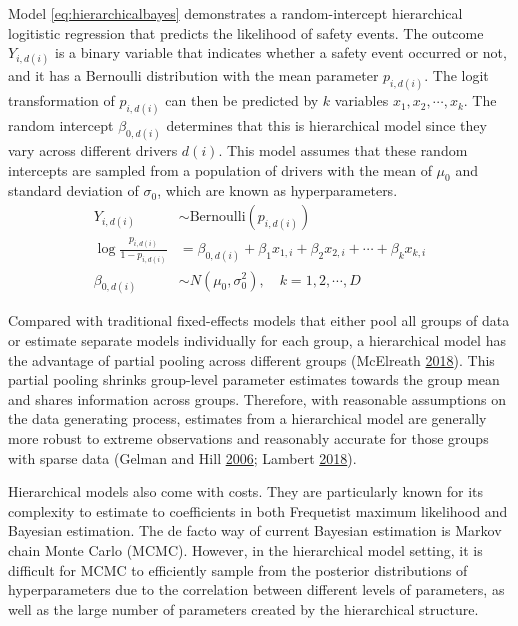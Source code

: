 \documentclass[12pt]{book}
\numberwithin{equation}{chapter}
\begin{document}
Model \eqref{eq:hierarchicalbayes} demonstrates a random-intercept hierarchical logitistic regression that predicts the likelihood of safety events. The outcome \(Y_{i, d(i)}\) is a binary variable that indicates whether a safety event occurred or not, and it has a Bernoulli distribution with the mean parameter \(p_{i, d(i)}\). The logit transformation of \(p_{i, d(i)}\) can then be predicted by \(k\) variables \(x_1, x_2, \cdots, x_k\). The random intercept \(\beta_{0, d(i)}\) determines that this is hierarchical model since they vary across different drivers \(d(i)\). This model assumes that these random intercepts are sampled from a population of drivers with the mean of \(\mu_0\) and standard deviation of \(\sigma_0\), which are known as hyperparameters.
\begin{equation}
\begin{split}
Y_{i, d(i)} &\sim \text{Bernoulli}(p_{i, d(i)})\\
\log\frac{p_{i, d(i)}}{1-p_{i, d(i)}} &= \beta_{0, d(i)} + \beta_1x_{1,i} + \beta_2x_{2,i} + \cdots + \beta_kx_{k,i}\\
\beta_{0, d(i)} &\sim N(\mu_0, \sigma_0^2), \quad k = 1, 2, \cdots, D
\label{eq:hierarchicalbayes}
\end{split}
\end{equation}

Compared with traditional fixed-effects models that either pool all groups of data or estimate separate models individually for each group, a hierarchical model has the advantage of partial pooling across different groups (McElreath \protect\hyperlink{ref-mcelreath2018statistical}{2018}). This partial pooling shrinks group-level parameter estimates towards the group mean and shares information across groups. Therefore, with reasonable assumptions on the data generating process, estimates from a hierarchical model are generally more robust to extreme observations and reasonably accurate for those groups with sparse data (Gelman and Hill \protect\hyperlink{ref-gelman2006data}{2006}; Lambert \protect\hyperlink{ref-lambert2018student}{2018}).

Hierarchical models also come with costs. They are particularly known for its complexity to estimate to coefficients in both Frequetist maximum likelihood and Bayesian estimation. The de facto way of current Bayesian estimation is Markov chain Monte Carlo (MCMC). However, in the hierarchical model setting, it is difficult for MCMC to efficiently sample from the posterior distributions of hyperparameters due to the correlation between different levels of parameters, as well as the large number of parameters created by the hierarchical structure.
\end{document}

